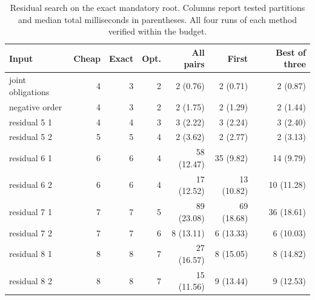 \begin{table}[tb]
\caption{Residual search on the exact mandatory root. Columns report
tested partitions and median total milliseconds in parentheses.
All four runs of each method verified within the budget.}
\centering
\small
\setlength{\tabcolsep}{3pt}
\begin{tabular}{lrrrrrr}
\hline
Input & Cheap & Exact & Opt. & All pairs & First & Best of three \\
\hline
joint obligations & 4 & 3 & 2 & 2 (0.76) & 2 (0.71) & 2 (0.87) \\
negative order & 4 & 3 & 2 & 2 (1.75) & 2 (1.29) & 2 (1.44) \\
residual 5 1 & 4 & 4 & 3 & 3 (2.22) & 3 (2.24) & 3 (2.40) \\
residual 5 2 & 5 & 5 & 4 & 2 (3.62) & 2 (2.77) & 2 (3.13) \\
residual 6 1 & 6 & 6 & 4 & 58 (12.47) & 35 (9.82) & 14 (9.79) \\
residual 6 2 & 6 & 6 & 4 & 17 (12.52) & 13 (10.82) & 10 (11.28) \\
residual 7 1 & 7 & 7 & 5 & 89 (23.08) & 69 (18.68) & 36 (18.61) \\
residual 7 2 & 7 & 7 & 6 & 8 (13.11) & 6 (13.33) & 6 (10.03) \\
residual 8 1 & 8 & 8 & 7 & 27 (16.57) & 8 (15.05) & 8 (14.82) \\
residual 8 2 & 8 & 8 & 7 & 15 (11.56) & 9 (13.44) & 9 (12.53) \\
\hline
\end{tabular}
\end{table}
